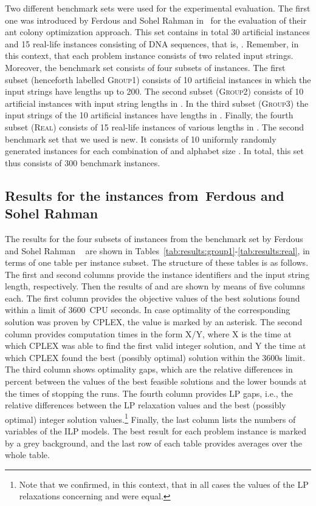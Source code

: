 \documentclass[11pt,a4paper]{article}
\begin{document}
Two different benchmark sets were used for the experimental evaluation.
The first one was introduced by Ferdous and Sohel Rahman
in~\cite{Ferdous2013} for the evaluation of their ant
colony optimization approach. This set contains in total 30 artificial
instances and 15 real-life instances consisting of DNA sequences, that is, .
Remember, in this context, that each problem instance consists of two
related input strings. Moreover, the benchmark set consists of four
subsets of instances. The first subset (henceforth labelled
\textsc{Group1}) consists of 10 artificial instances in which the input
strings have lengths up to 200. The second subset (\textsc{Group2})
consists of 10 artificial instances with input string lengths in
. In the third subset (\textsc{Group3}) the input strings of
the 10 artificial instances have lengths in . Finally,
the fourth subset (\textsc{Real}) consists of 15 real-life instances of
various lengths in . The second benchmark set that we used
is new. It consists of 10 uniformly randomly generated instances for each
combination of  and alphabet size . In total, this set thus consists of 300 benchmark instances.

\subsection{Results for the instances from~Ferdous and Sohel Rahman}

The results for the four subsets of instances from the benchmark set by
Ferdous and Sohel Rahman ~\cite{Ferdous2013} are shown in
Tables~\ref{tab:results:group1}-\ref{tab:results:real}, in terms of one
table per instance subset. The structure of these tables is as follows.
The first and second columns provide the instance identifiers and the input string length, respectively. Then the results of
 and  are shown by means of five columns each.
The first column provides the objective values of the best solutions
found within a limit of 3600~CPU seconds. In case optimality of the
corresponding solution was proven by CPLEX, the value is marked by an
asterisk. The second column provides computation times in the form X/Y, 
where X is the time at which CPLEX was able to find the first valid integer
solution, and Y the time at which CPLEX found the best
(possibly optimal) solution within the 3600s limit. The third 
column shows optimality gaps, which are the relative differences in
percent between the values of the best feasible solutions and the lower
bounds at the times of stopping the runs. The fourth column provides LP
gaps, i.e.,
the relative differences between the LP relaxation values and the
best (possibly optimal) integer solution values.\footnote{Note that we
confirmed, in this context, that in all cases the values of the LP
relaxations concerning  and  were equal.} Finally,
the last column lists the numbers of variables of the ILP models.
The best result for each problem instance
is marked by a grey background, and the last row of each table provides
averages over the whole table.
\end{document}
